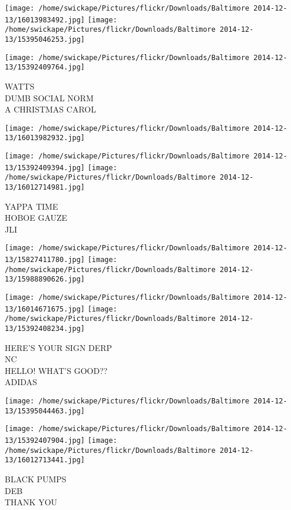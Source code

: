 \documentclass[10pt,letterpaper]{article}
\begin{document}
\texttt{[image: /home/swickape/Pictures/flickr/Downloads/Baltimore 2014-12-13/16013983492.jpg]}
\texttt{[image: /home/swickape/Pictures/flickr/Downloads/Baltimore 2014-12-13/15395046253.jpg]}

\texttt{[image: /home/swickape/Pictures/flickr/Downloads/Baltimore 2014-12-13/15392409764.jpg]}

WATTS\\
DUMB SOCIAL NORM\\
A CHRISTMAS CAROL\\
\pagebreak

\texttt{[image: /home/swickape/Pictures/flickr/Downloads/Baltimore 2014-12-13/16013982932.jpg]}

\vspace{0.25in}
\texttt{[image: /home/swickape/Pictures/flickr/Downloads/Baltimore 2014-12-13/15392409394.jpg]}
\texttt{[image: /home/swickape/Pictures/flickr/Downloads/Baltimore 2014-12-13/16012714981.jpg]}

YAPPA TIME\\
HOBOE GAUZE\\
JLI\\
\pagebreak

\texttt{[image: /home/swickape/Pictures/flickr/Downloads/Baltimore 2014-12-13/15827411780.jpg]}
\texttt{[image: /home/swickape/Pictures/flickr/Downloads/Baltimore 2014-12-13/15988890626.jpg]}

\texttt{[image: /home/swickape/Pictures/flickr/Downloads/Baltimore 2014-12-13/16014671675.jpg]}
\texttt{[image: /home/swickape/Pictures/flickr/Downloads/Baltimore 2014-12-13/15392408234.jpg]}

HERE'S YOUR SIGN DERP\\
NC\\
HELLO!  WHAT'S GOOD??\\
ADIDAS\\
\pagebreak

\texttt{[image: /home/swickape/Pictures/flickr/Downloads/Baltimore 2014-12-13/15395044463.jpg]}

\vspace{0.25in}
\texttt{[image: /home/swickape/Pictures/flickr/Downloads/Baltimore 2014-12-13/15392407904.jpg]}
\texttt{[image: /home/swickape/Pictures/flickr/Downloads/Baltimore 2014-12-13/16012713441.jpg]}

BLACK PUMPS\\
DEB\\
THANK YOU\\
\pagebreak
\end{document}
